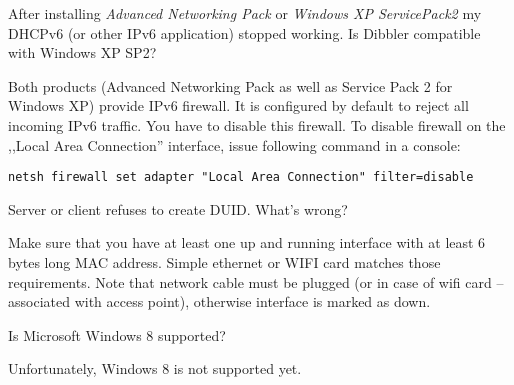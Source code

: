 \Q After installing \emph{Advanced Networking Pack} or \emph{Windows XP
  ServicePack2} my DHCPv6 (or other IPv6 application) stopped
working. Is Dibbler compatible with Windows XP SP2?

\A Both products (Advanced Networking Pack as well as Service Pack 2
for Windows XP) provide IPv6 firewall. It is configured by default to
reject all incoming IPv6 traffic. You have to disable this
firewall. To disable firewall on the ,,Local Area Connection''
interface, issue following command in a console:

\begin{lstlisting}
netsh firewall set adapter "Local Area Connection" filter=disable
\end{lstlisting}

\Q Server or client refuses to create DUID. What's wrong?

\A Make sure that you have at least one up and running interface with
at least 6 bytes long MAC address. Simple ethernet or WIFI card
matches those requirements. Note that network cable must be plugged
(or in case of wifi card -- associated with access point), otherwise
interface is marked as down.

\Q Is Microsoft Windows 8 supported?

\A Unfortunately, Windows 8 is not supported yet.

